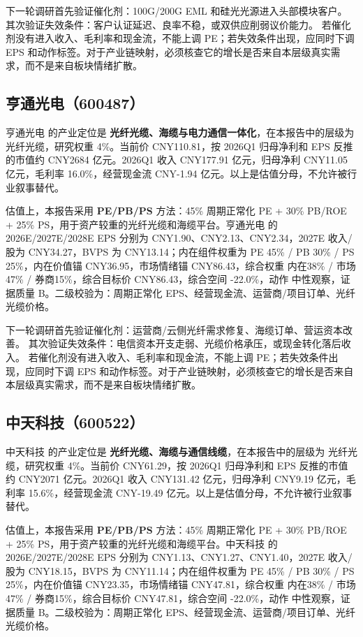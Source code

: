 下一轮调研首先验证催化剂：100G/200G EML 和硅光光源进入头部模块客户。 其次验证失效条件：客户认证延迟、良率不稳，或双供应削弱议价能力。 若催化剂没有进入收入、毛利率和现金流，不能上调 PE；若失效条件出现，应同时下调 EPS 和动作标签。对于产业链映射，必须核查它的增长是否来自本层级真实需求，而不是来自板块情绪扩散。


\subsection{亨通光电（600487）}
亨通光电 的产业定位是 \textbf{光纤光缆、海缆与电力通信一体化}，在本报告中的层级为 光纤光缆，研究权重 4\%。当前价 CNY110.81，按 2026Q1 归母净利和 EPS 反推的市值约 CNY2684 亿元。2026Q1 收入 CNY177.91 亿元，归母净利 CNY11.05 亿元，毛利率 16.0\%，经营现金流 CNY-1.94 亿元。以上是估值分母，不允许被行业叙事替代。

估值上，本报告采用 \textbf{PE/PB/PS} 方法：45\% 周期正常化 PE + 30\% PB/ROE + 25\% PS，用于资产较重的光纤光缆和海缆平台。亨通光电 的 2026E/2027E/2028E EPS 分别为 CNY1.90、CNY2.13、CNY2.34，2027E 收入/股为 CNY34.27，BVPS 为 CNY13.14；内在组件权重为 PE 45\% / PB 30\% / PS 25\%，内在价值锚 CNY36.95，市场情绪锚 CNY86.43，综合权重 内在38\% / 市场47\% / 券商15\%，综合目标价 CNY86.43，综合空间 -22.0\%，动作 中性观察，证据质量 B。二级校验为：周期正常化 EPS、经营现金流、运营商/项目订单、光纤光缆价格。

下一轮调研首先验证催化剂：运营商/云侧光纤需求修复、海缆订单、营运资本改善。 其次验证失效条件：电信资本开支走弱、光缆价格承压，或现金转化落后收入。 若催化剂没有进入收入、毛利率和现金流，不能上调 PE；若失效条件出现，应同时下调 EPS 和动作标签。对于产业链映射，必须核查它的增长是否来自本层级真实需求，而不是来自板块情绪扩散。


\subsection{中天科技（600522）}
中天科技 的产业定位是 \textbf{光纤光缆、海缆与通信线缆}，在本报告中的层级为 光纤光缆，研究权重 4\%。当前价 CNY61.29，按 2026Q1 归母净利和 EPS 反推的市值约 CNY2071 亿元。2026Q1 收入 CNY131.42 亿元，归母净利 CNY9.19 亿元，毛利率 15.6\%，经营现金流 CNY-19.49 亿元。以上是估值分母，不允许被行业叙事替代。

估值上，本报告采用 \textbf{PE/PB/PS} 方法：45\% 周期正常化 PE + 30\% PB/ROE + 25\% PS，用于资产较重的光纤光缆和海缆平台。中天科技 的 2026E/2027E/2028E EPS 分别为 CNY1.13、CNY1.27、CNY1.40，2027E 收入/股为 CNY18.15，BVPS 为 CNY11.14；内在组件权重为 PE 45\% / PB 30\% / PS 25\%，内在价值锚 CNY23.35，市场情绪锚 CNY47.81，综合权重 内在38\% / 市场47\% / 券商15\%，综合目标价 CNY47.81，综合空间 -22.0\%，动作 中性观察，证据质量 B。二级校验为：周期正常化 EPS、经营现金流、运营商/项目订单、光纤光缆价格。

